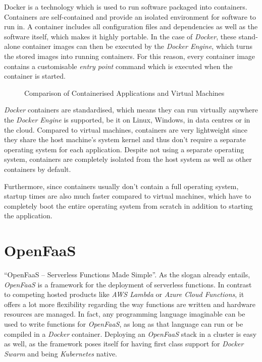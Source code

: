Docker is a technology which is used to run software packaged into containers. Containers are
self-contained and provide an isolated environment for software to run in. A container includes all
configuration files and dependencies as well as the software itself, which makes it highly portable.
In the case of \textit{Docker}, these stand-alone container images can then be executed by the
\textit{Docker Engine}, which turns the stored images into running containers. For this reason,
every container image contains a customisable \textit{entry point} command which is executed when
the container is started.

\begin{figure}[H]
  \centering
  \caption{Comparison of Containerised Applications and Virtual Machines \cite{docker-container}}
\end{figure}

\textit{Docker} containers are standardised, which means they can run virtually anywhere the
\textit{Docker Engine} is supported, be it on Linux, Windows, in data centres or in the cloud.
Compared to virtual machines, containers are very lightweight since they share the host machine's
system kernel and thus don't require a separate operating system for each application. Despite not
using a separate operating system, containers are completely isolated from the host system as well
as other containers by default.

Furthermore, since containers usually don't contain a full operating system, startup times are also
much faster compared to virtual machines, which have to completely boot the entire operating system
from scratch in addition to starting the application. \cite{docker-container}

\section{OpenFaaS}

“OpenFaaS – Serverless Functions Made Simple”. As the slogan already entails, \textit{OpenFaaS} is a
framework for the deployment of serverless functions. In contrast to competing hosted products like
\textit{AWS Lambda} or \textit{Azure Cloud Functions}, it offers a lot more flexibility regarding
the way functions are written and hardware resources are managed. In fact, any programming language
imaginable can be used to write functions for \textit{OpenFaaS}, as long as that language can run or
be compiled in a \textit{Docker} container. Deploying an \textit{OpenFaaS} stack in a cluster is
easy as well, as the framework poses itself for having first class support for \textit{Docker Swarm}
and being \textit{Kubernetes} native. \cite{openfaas-docs}

